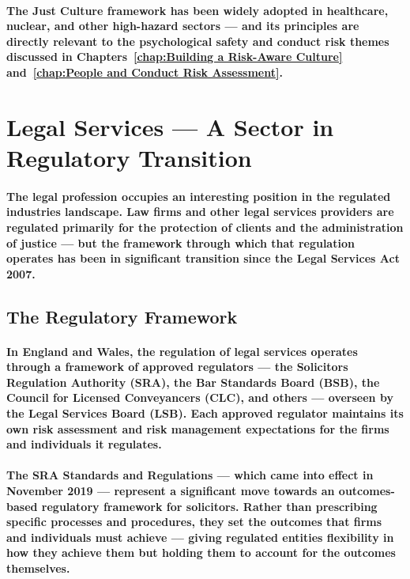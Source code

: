 \paragraph{The Just Culture framework has been widely adopted in healthcare, nuclear, and other high-hazard sectors — and its principles are directly relevant to the psychological safety and conduct risk themes discussed in Chapters~\ref{chap:Building a Risk-Aware Culture} and~\ref{chap:People and Conduct Risk Assessment}.}

\section{Legal Services — A Sector in Regulatory Transition}
\paragraph{The legal profession occupies an interesting position in the regulated industries landscape. Law firms and other legal services providers are regulated primarily for the protection of clients and the administration of justice — but the framework through which that regulation operates has been in significant transition since the Legal Services Act 2007.}

\subsection{The Regulatory Framework}
\paragraph{In England and Wales, the regulation of legal services operates through a framework of \textbf{approved regulators} — the Solicitors Regulation Authority (SRA), the Bar Standards Board (BSB), the Council for Licensed Conveyancers (CLC), and others — overseen by the Legal Services Board (LSB). Each approved regulator maintains its own risk assessment and risk management expectations for the firms and individuals it regulates.}
\paragraph{The \textbf{SRA Standards and Regulations} — which came into effect in November 2019 — represent a significant move towards an outcomes-based regulatory framework for solicitors. Rather than prescribing specific processes and procedures, they set the outcomes that firms and individuals must achieve — giving regulated entities flexibility in how they achieve them but holding them to account for the outcomes themselves.}

